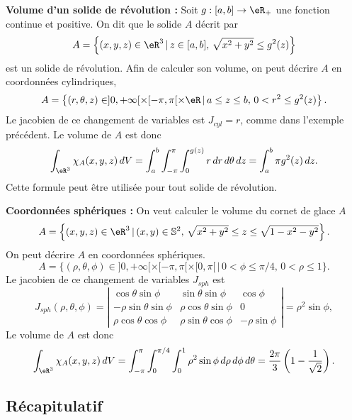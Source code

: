\begin{example}
\textbf{Volume d'un solide de révolution : }Soit $g:[a,b]\to\eR_+$ une fonction continue et positive. On dit que le solide $A$ décrit par
\[
A=\left\{(x,y,z)\in\eR^3\, \vert \, z\in[a,b], \,\sqrt{x^2+y^2}\leq g^2(z) \right\}
\]
est un solide de révolution. Afin de calculer son volume, on peut décrire $A$ en coordonnées cylindriques, 
\[
A=\left\{(r,\theta,z) \in ]0, +\infty[\times [-\pi,\pi[\times \eR\,\vert\, a\leq z\leq b, \, 0<r^2\leq g^2(z) \right\}.
\]
Le jacobien de ce changement de variables est  $J_{cyl}=r$, comme dans l'exemple précédent. Le volume de $A$ est donc
\[
\int_{\eR^3}\chi_{A}(x,y,z)\, dV=\int_a^{b}\int_{-\pi}^{\pi}\int_{0}^{g(z)} r  \,dr\,d\theta\, dz=\int_a^{b} \pi g^2(z) \, dz.
\] 
Cette formule peut être utilisée pour tout solide de révolution. 
\end{example}

\begin{example}
\textbf{Coordonnées sphériques : }On veut calculer le volume du cornet de glace  $A$ 
\[
A=\left\{(x,y,z)\in\eR^3\, \vert \, (x,y)\in \mathbb{S}^2, \,\sqrt{x^2+y^2}\leq z\leq \sqrt{1-x^2-y^2} \right\}. 
\]
On peut décrire $A$ en coordonnées sphériques. 
\[
A=\{(\rho,\theta,\phi) \in ]0, +\infty[\times [-\pi,\pi[\times [0,\pi[\,\vert\, 0<\phi\leq\pi/4, \, 0<\rho\leq 1 \}.
\]
Le jacobien de ce changement de variables  $J_{sph}$ est
\begin{equation}
 J_{sph}(\rho, \theta, \phi)= \left\vert\begin{array}{ccc}
\cos \theta \sin\phi & \sin \theta\sin\phi & \cos\phi\\
-\rho\sin \theta\sin\phi  & \rho\cos \theta\sin\phi & 0 \\
\rho\cos\theta\cos\phi&\rho\sin\theta\cos\phi& -\rho\sin\phi
\end{array}\right\vert= \rho^2\sin\phi,
\end{equation}
Le volume de $A$ est donc
\[
\int_{\eR^3}\chi_{A}(x,y,z)\, dV=\int_{-\pi}^{\pi}\int_0^{\pi/4}\int_{0}^{1}\rho^2\sin\phi \,d\rho\,d\phi\,d\theta=\frac{2\pi}{3}\left(1-\frac{1}{\sqrt{2}}\right).  
\] 
\end{example}

\subsection{Récapitulatif}


